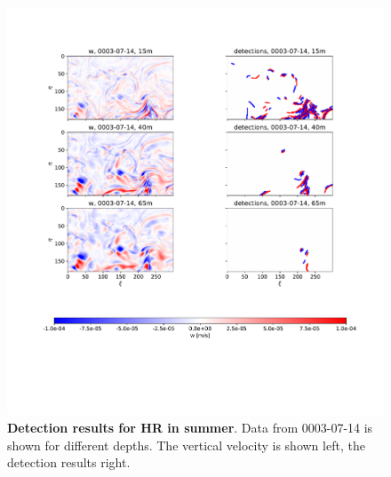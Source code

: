 \begin{figure}
    \centering
    \includegraphics[width=16cm, trim=2.5cm 0 0 2cm]{figures/eval_det_subm_summer.pdf}
    \caption[Detection results for HR in summer]{\textbf{Detection results for HR in summer}. Data from 0003-07-14 is shown for different depths. The vertical velocity is shown left, the detection results right.}\label{fig:subm_det_summer}
\end{figure}

